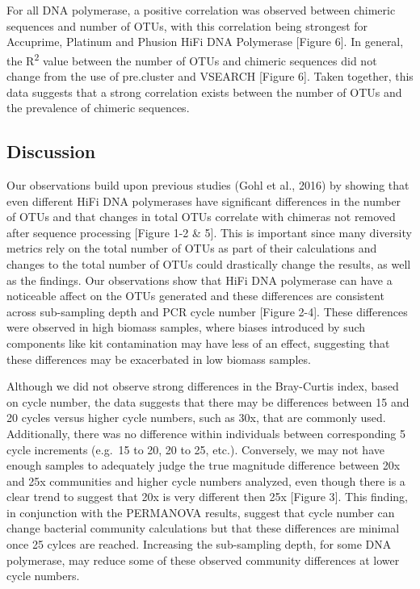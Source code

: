 \documentclass[12pt,]{article}
\begin{document}
For all DNA polymerase, a positive correlation was observed between
chimeric sequences and number of OTUs, with this correlation being
strongest for Accuprime, Platinum and Phusion HiFi DNA Polymerase
{[}Figure 6{]}. In general, the R\textsuperscript{2} value between the
number of OTUs and chimeric sequences did not change from the use of
pre.cluster and VSEARCH {[}Figure 6{]}. Taken together, this data
suggests that a strong correlation exists between the number of OTUs and
the prevalence of chimeric sequences.

\newpage

\subsection{Discussion}\label{discussion}

Our observations build upon previous studies (Gohl et al., 2016) by
showing that even different HiFi DNA polymerases have significant
differences in the number of OTUs and that changes in total OTUs
correlate with chimeras not removed after sequence processing {[}Figure
1-2 \& 5{]}. This is important since many diversity metrics rely on the
total number of OTUs as part of their calculations and changes to the
total number of OTUs could drastically change the results, as well as
the findings. Our observations show that HiFi DNA polymerase can have a
noticeable affect on the OTUs generated and these differences are
consistent across sub-sampling depth and PCR cycle number {[}Figure
2-4{]}. These differences were observed in high biomass samples, where
biases introduced by such components like kit contamination may have
less of an effect, suggesting that these differences may be exacerbated
in low biomass samples.

Although we did not observe strong differences in the Bray-Curtis index,
based on cycle number, the data suggests that there may be differences
between 15 and 20 cycles versus higher cycle numbers, such as 30x, that
are commonly used. Additionally, there was no difference within
individuals between corresponding 5 cycle increments (e.g.~15 to 20, 20
to 25, etc.). Conversely, we may not have enough samples to adequately
judge the true magnitude difference between 20x and 25x communities and
higher cycle numbers analyzed, even though there is a clear trend to
suggest that 20x is very different then 25x {[}Figure 3{]}. This
finding, in conjunction with the PERMANOVA results, suggest that cycle
number can change bacterial community calculations but that these
differences are minimal once 25 cylces are reached. Increasing the
sub-sampling depth, for some DNA polymerase, may reduce some of these
observed community differences at lower cycle numbers.
\end{document}

